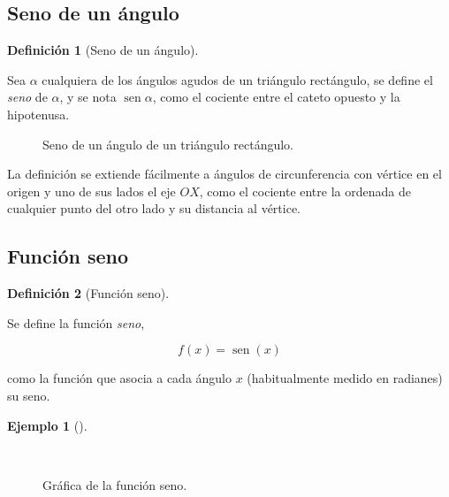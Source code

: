 \documentclass[
  a4paper,
]{scrreport}
\theoremstyle{plain}
\theoremstyle{plain}
\theoremstyle{definition}
\newtheorem{definition}{Definición}[chapter]
\theoremstyle{plain}
\theoremstyle{definition}
\newtheorem{example}{Ejemplo}[chapter]
\theoremstyle{remark}
\begin{document}
\hypertarget{seno-de-un-uxe1ngulo}{%
\subsection{Seno de un ángulo}\label{seno-de-un-uxe1ngulo}}

\leavevmode{}%
\begin{definition}[Seno de un ángulo]\label{def-seno-angulo}

Sea \(\alpha\) cualquiera de los ángulos agudos de un triángulo
rectángulo, se define el \emph{seno} de \(\alpha\), y se nota
\(\operatorname{sen} \alpha\), como el cociente entre el cateto opuesto
y la hipotenusa.

\end{definition}

\begin{figure}

{\centering 



}

\caption{Seno de un ángulo de un triángulo rectángulo.}

\end{figure}

La definición se extiende fácilmente a ángulos de circunferencia con
vértice en el origen y uno de sus lados el eje \(OX\), como el cociente
entre la ordenada de cualquier punto del otro lado y su distancia al
vértice.

\hypertarget{funciuxf3n-seno}{%
\subsection{Función seno}\label{funciuxf3n-seno}}

\leavevmode{}%
\begin{definition}[Función seno]\label{def-funcion-seno}

Se define la función \emph{seno},

\[f(x)=\operatorname{sen}(x)\]

como la función que asocia a cada ángulo \(x\) (habitualmente medido en
radianes) su seno.

\end{definition}

\leavevmode{}%
\begin{example}[]\label{exm-funcion-seno}

~

\begin{figure}

{\centering 



}

\caption{Gráfica de la función seno.}

\end{figure}

\end{example}
\end{document}
